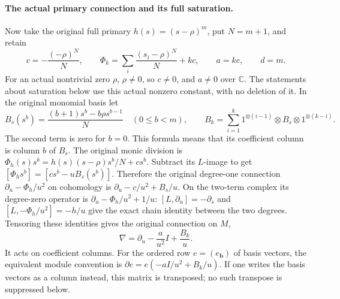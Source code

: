 \paragraph{The actual primary connection and its full saturation.}
Now take the original full primary
\(h(s)=(s-\rho)^m\), put \(N=m+1\),
and retain
\[
 c=-\frac{(-\rho)^N}{N},\qquad
 \Phi_k=\sum_i\frac{(s_i-\rho)^N}{N}+kc,\qquad
 a=kc,\qquad d=m.
                                                               \tag{MLT.33}
\]
For an actual nontrivial zero \(\rho\),
\(\rho\ne0\), so \(c\ne0\), and \(a\ne0\)
over \(\mathbb C\). The statements about
saturation below use this actual nonzero
constant, with no deletion of it.
In the original monomial basis let
\[
 B_s(s^b)=\frac{(b+1)s^b-b\rho s^{b-1}}{N}
       \quad(0\le b<m),\qquad
 B_k=\sum_{i=1}^k1^{\otimes(i-1)}
                   \otimes B_s\otimes1^{\otimes(k-i)}.
                                                               \tag{MLT.34}
\]
The second term is zero for \(b=0\).
This formula means that its coefficient
column is column \(b\) of \(B_s\).
The original monic division is
\(\Phi_h(s)s^b=h(s)(s-\rho)s^b/N+cs^b\).
Subtract its \(L\)-image to get
\([\Phi_hs^b]=[cs^b-uB_s(s^b)]\).
Therefore the original degree-one
connection \(\partial_u-\Phi_h/u^2\)
on cohomology is
\(\partial_u-c/u^2+B_s/u\).
On the two-term complex its degree-zero
operator is \(\partial_u-\Phi_h/u^2+1/u\):
\([L,\partial_u]=-\partial_s\) and
\([L,-\Phi_h/u^2]=-h/u\) give the
exact chain identity between the two
degrees. Tensoring these identities
gives the original connection on \(M\),
\[
               \nabla=\partial_u-\frac{a}{u^2}I
                                      +\frac{B_k}{u}.     \tag{MLT.35}
\]
It acts on coefficient columns.
For the ordered row \(e=(e_{\mathbf b})\)
of basis vectors, the equivalent
module convention is
\(\partial e=e(-aI/u^2+B_k/u)\).
If one writes the basis vectors as a
column instead, this matrix is transposed;
no such transpose is suppressed below.

